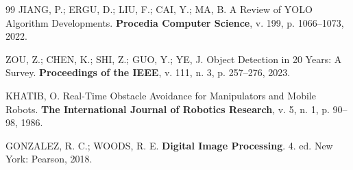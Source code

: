 \begin{thebibliography}{99}
JIANG, P.; ERGU, D.; LIU, F.; CAI, Y.; MA, B. A Review of YOLO Algorithm Developments. \textbf{Procedia Computer Science}, v. 199, p. 1066--1073, 2022.

ZOU, Z.; CHEN, K.; SHI, Z.; GUO, Y.; YE, J. Object Detection in 20 Years: A Survey. \textbf{Proceedings of the IEEE}, v. 111, n. 3, p. 257--276, 2023.

KHATIB, O. Real-Time Obstacle Avoidance for Manipulators and Mobile Robots. \textbf{The International Journal of Robotics Research}, v. 5, n. 1, p. 90--98, 1986.

GONZALEZ, R. C.; WOODS, R. E. \textbf{Digital Image Processing}. 4. ed. New York: Pearson, 2018.

\end{thebibliography}